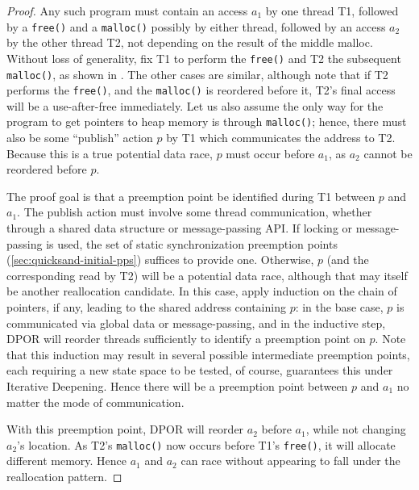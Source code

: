 \begin{proof}
Any such program must contain an access $a_1$ by one thread T1,
followed by a {\tt free()} and a {\tt malloc()} possibly by either thread,
followed by an access $a_2$ by the other thread T2,
not depending on the result of the middle malloc.
Without loss of generality, fix T1 to perform the {\tt free()} and T2 the subsequent {\tt malloc()},
as shown in .
The other cases are similar,
although note that if T2 performs the {\tt free()},
and the {\tt malloc()} is reordered before it,
T2's final access will be a use-after-free immediately.
Let us also assume the only way for the program to get pointers to heap memory is through {\tt malloc()};
hence, there must also be some ``publish'' action $p$ by T1 which communicates the address to T2.
Because this is a true potential data race,
$p$ must occur before $a_1$, as $a_2$ cannot be reordered before $p$.

The proof goal is that a preemption point be identified during T1 between $p$ and $a_1$.
The publish action must involve some thread communication,
whether through a shared data structure or message-passing API.
If locking or message-passing is used, the set of static synchronization preemption points
(\cref{sec:quicksand-initial-pps})
suffices to provide one.
Otherwise, $p$ (and the corresponding read by T2) will be a potential data race,
although that may itself be another reallocation candidate.
In this case, apply induction on the chain of pointers, if any, leading to the shared address containing $p$:
in the base case, $p$ is communicated via global data or message-passing,
and in the inductive step, DPOR will reorder threads sufficiently to identify a preemption point on $p$.
Note that this induction may result in several possible intermediate preemption points,
each requiring a new state space to be tested,
of course,  guarantees this under Iterative Deepening.
Hence there will be a preemption point between $p$ and $a_1$ no matter the mode of communication.

With this preemption point,
DPOR will reorder $a_2$ before $a_1$, while not changing $a_2$'s location.
As T2's {\tt malloc()} now occurs before T1's {\tt free()}, it will allocate different memory.
Hence $a_1$ and $a_2$ %
can race without appearing to fall under the reallocation pattern.
\end{proof}

